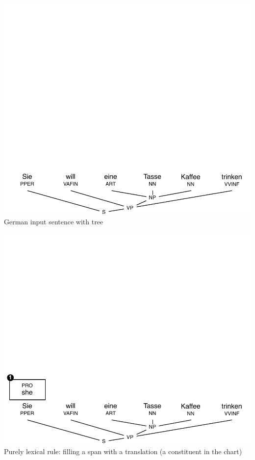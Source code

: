 \documentclass[landscape]{slides}
\begin{document}

\vspace{-31mm}
\begin{center}
\includegraphics[scale=1.15]{chart-parsing0.pdf}\\
German input sentence with tree
\end{center}


\vspace{-31mm}
\begin{center}
\includegraphics[scale=1.15]{chart-parsing1.pdf}\\
Purely lexical rule: filling a span with a translation (a constituent in the chart)
\end{center}
\end{document}
